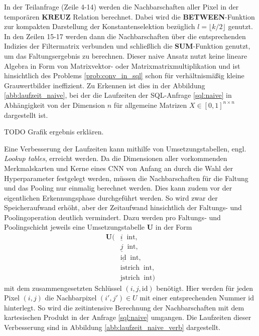 In der Teilanfrage (Zeile 4-14) werden die Nachbarschaften aller Pixel in der temporären $\mathbf{KREUZ}$ Relation berechnet. Dabei wird die \textbf{BETWEEN}-Funktion zur kompakten Darstellung der Konstantenselektion bezüglich $l=\lfloor k/2 \rfloor$ genutzt. In den Zeilen 15-17 werden dann die Nachbarschaften über die entsprechenden Indizies der Filtermatrix verbunden und schließlich die \textbf{SUM}-Funktion genutzt, um das Faltungsergebnis zu berechnen. Dieser naive Ansatz nutzt keine lineare Algebra in Form von Matrixvektor- oder Matrixmatrixmultiplikation und ist hinsichtlich des Problems \ref{prob:conv_in_sql} schon für verhältnismäßig kleine Grauwertbilder ineffizient. Zu Erkennen ist dies in der Abbildung \ref{abb:laufzeit_naive}, bei der die Laufzeiten der SQL-Anfrage \ref{sql:naive} in Abhängigkeit von der Dimension $n$ für allgemeine Matrizen $X \in [0,1]^{n \times n}$ dargestellt ist.

TODO Grafik ergebnis erklären.

Eine Verbesserung der Laufzeiten kann mithilfe von Umsetzungstabellen, engl. \textit{Lookup tables}, erreicht werden. Da die Dimensionen aller vorkommenden Merkmalskarten und Kerne eines CNN von Anfang an durch die Wahl der Hyperparameter festgelegt werden, müssen die Nachbarschaften für die Faltung und das Pooling nur einmalig berechnet werden. Dies kann zudem vor der eigentlichen Erkennungsphase durchgeführt werden. So wird zwar der Speicheraufwand erhöht, aber der Zeitaufwand hinsichtlich der Faltungs- und Poolingoperation deutlich vermindert. Dazu werden pro Faltungs- und Poolingschicht jeweils eine Umsetzungstabelle \textbf{U} in der Form 
\begin{align*}
    \mathbf{U}( &\underline{i} \; \; \mathrm{int}, \\
    &\underline{j} \; \;\mathrm{int},\\
    &\underline{\text{id}} \; \; \mathrm{int}, \\
    &\text{istrich} \; \; \mathrm{int},\\
    &\text{jstrich}\; \; \mathrm{int})
\end{align*}
mit dem zusammengesetzten Schlüssel $(i,j,\text{id})$ benötigt. Hier werden für jeden Pixel $(i,j)$ die Nachbarpixel $(i', j') \in U$ mit einer entsprechenden Nummer $\text{id}$ hinterlegt. So wird die zeitintensive Berechnung der Nachbarschaften mit dem  kartesischen Produkt in der Anfrage \ref{sql:naive} umgangen. Die Laufzeiten dieser Verbesserung sind in Abbildung \ref{abb:laufzeit_naive_verb} dargestellt.

